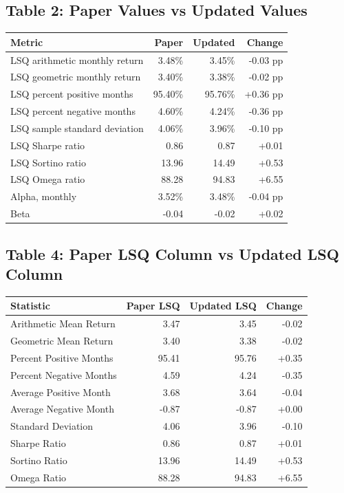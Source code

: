 \documentclass[11pt]{article}
\begin{document}
\subsection*{Table 2: Paper Values vs Updated Values}
\small
\begin{center}
\begin{tabular}{lrrr}
\toprule
Metric & Paper & Updated & Change \\
\midrule
LSQ arithmetic monthly return & 3.48\% & 3.45\% & -0.03 pp \\
LSQ geometric monthly return & 3.40\% & 3.38\% & -0.02 pp \\
LSQ percent positive months & 95.40\% & 95.76\% & +0.36 pp \\
LSQ percent negative months & 4.60\% & 4.24\% & -0.36 pp \\
LSQ sample standard deviation & 4.06\% & 3.96\% & -0.10 pp \\
LSQ Sharpe ratio & 0.86 & 0.87 & +0.01 \\
LSQ Sortino ratio & 13.96 & 14.49 & +0.53 \\
LSQ Omega ratio & 88.28 & 94.83 & +6.55 \\
Alpha, monthly & 3.52\% & 3.48\% & -0.04 pp \\
Beta & -0.04 & -0.02 & +0.02 \\
\bottomrule
\end{tabular}
\end{center}
\normalsize

\subsection*{Table 4: Paper LSQ Column vs Updated LSQ Column}
\small
\begin{center}
\begin{tabular}{lrrr}
\toprule
Statistic & Paper LSQ & Updated LSQ & Change \\
\midrule
Arithmetic Mean Return & 3.47 & 3.45 & -0.02 \\
Geometric Mean Return & 3.40 & 3.38 & -0.02 \\
Percent Positive Months & 95.41 & 95.76 & +0.35 \\
Percent Negative Months & 4.59 & 4.24 & -0.35 \\
Average Positive Month & 3.68 & 3.64 & -0.04 \\
Average Negative Month & -0.87 & -0.87 & +0.00 \\
Standard Deviation & 4.06 & 3.96 & -0.10 \\
Sharpe Ratio & 0.86 & 0.87 & +0.01 \\
Sortino Ratio & 13.96 & 14.49 & +0.53 \\
Omega Ratio & 88.28 & 94.83 & +6.55 \\
\bottomrule
\end{tabular}
\end{center}
\normalsize
\end{document}
